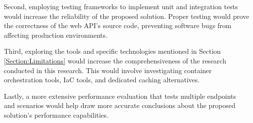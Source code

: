 \documentclass[12pt, reqno]{amsbook}
\theoremstyle{definition}
\theoremstyle{definition}
\numberwithin{section}{chapter}
\numberwithin{table}{chapter}
\numberwithin{figure}{chapter}
\begin{document}
Second, employing testing frameworks to implement unit and integration tests would increase the reliability of the proposed solution. Proper testing would prove the correctness of the web \ac{API}'s source code, preventing software bugs from affecting production environments.

Third, exploring the tools and specific technologies mentioned in Section \ref{Section:Limitations} would increase the comprehensiveness of the research conducted in this research. This would involve investigating container orchestration tools, \ac{IaC} tools, and dedicated caching alternatives.

Lastly, a more extensive performance evaluation that tests multiple endpoints and scenarios would help draw more accurate conclusions about the proposed solution's performance capabilities.

\printbibliography[title={References}]
\end{document}

